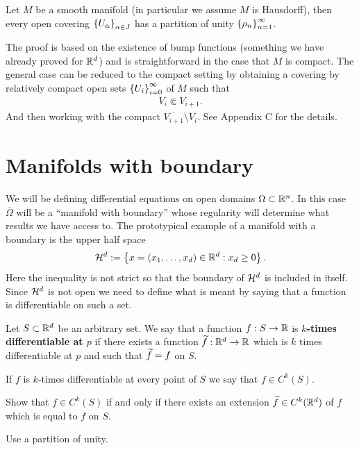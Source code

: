 \documentclass[
    a4paper,
    DIV=14,
    abstract=true,
    numbers=noenddot
]{scrartcl}
\begin{document}
\begin{theorem}\label{partition}
	Let $M$ be a smooth manifold (in particular we assume $M$ is Hausdorff), then every open covering $ \left\{U_\alpha\right\}_{\alpha \in  J} $ has a partition of unity $\left\{\rho _n\right\}_{n=1}^\infty $.
\end{theorem}
The proof is based on the existence of bump functions (something we have already proved for $\mathbb{R}^d$) and is straightforward in the case that $M$ is compact. The general case can be reduced to the compact setting by obtaining a covering by relatively compact open sets $\left\{U_i\right\}_{i=0}^\infty $ of $M$ such that \begin{align*}
	V_{i} \Subset V_{i+1}.
\end{align*}
And then working with the compact $\overline{V_{i+1}} \setminus V_{i} $.    See \cite{tu2011manifolds} Appendix C for the details.



\section{Manifolds with boundary}\label{boundary}
We will be defining differential equations on open domains $\Omega \subset \mathbb{R}^n$. In this case $\overline{\Omega}$ will be a ``manifold with boundary'' whose regularity will determine what results we have access to. The prototypical example of a manifold with a boundary is the upper half space
\begin{align*}
	\mathcal{H}^d:=\left\{x=(x_1,\ldots,x_d)\in \mathbb{R}^d: x_d \geq 0\right\} .
\end{align*}
Here the inequality is not strict so that the boundary of $\mathcal{H}^d$ is included in itself. Since $\mathcal{H}^d$ is not open we need to define what is meant by saying that a function is differentiable on such a set.
\begin{definition}\label{smooth non open}
	Let $S \subset \mathbb{R}^d$ be an arbitrary set. We say that a function $f:S \to \mathbb{R}$ is  \textbf{$k$-times differentiable at $p$} if there exists a function $\widetilde{f}:\mathbb{R}^d \to \mathbb{R}$ which is $k$ times differentiable at  $p$ and such that $\widetilde{f}=f$ on $S$.
\end{definition}
\begin{definition}
	If $f$ is  $k$-times differentiable at every point of  $S$ we say that $f \in C^k(S)$.
\end{definition}
\begin{exercise}\label{ext}
	Show that $f\in  C^k(S)$ if and only if there exists an extension $\widetilde{f}\in C^k(\mathbb{R}^d)$ of $f$ which is equal to $f$ on $S$.
\end{exercise}
\begin{hint}
	Use a partition of unity.
\end{hint}
\end{document}

